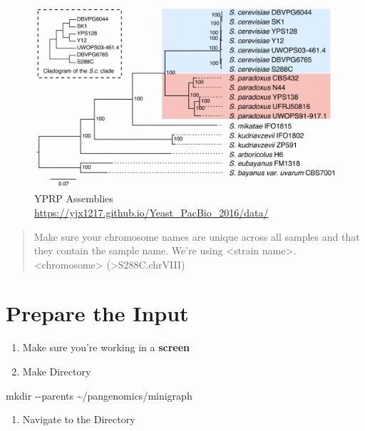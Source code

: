 \documentclass[
]{book}
\newenvironment{Shaded}{\begin{snugshade}}{\end{snugshade}}
\newcommand{\AttributeTok}[1]{\textcolor[rgb]{0.77,0.63,0.00}{#1}}
\newcommand{\FunctionTok}[1]{\textcolor[rgb]{0.00,0.00,0.00}{#1}}
\newcommand{\NormalTok}[1]{#1}
\providecommand{\tightlist}{%
  \setlength{\itemsep}{0pt}\setlength{\parskip}{0pt}}
\begin{document}
\begin{figure}
\centering
\includegraphics[width=1\textwidth,height=\textheight]{./Figures/Yeast.png}
\caption{YPRP Assemblies \url{https://yjx1217.github.io/Yeast_PacBio_2016/data/}}
\end{figure}

\begin{quote}
Make sure your chromosome names are unique across all samples and that they contain the sample name. We're using \textless strain name\textgreater.\textless chromosome\textgreater{} (\textgreater S288C.chrVIII)
\end{quote}

\hypertarget{prepare-the-input}{%
\section{Prepare the Input}\label{prepare-the-input}}

\begin{enumerate}
\def\labelenumi{\arabic{enumi}.}
\item
  Make sure you're working in a \textbf{screen}
\item
  Make Directory
\end{enumerate}

\begin{Shaded}
\begin{Highlighting}[]
\FunctionTok{mkdir} \AttributeTok{{-}{-}parents}\NormalTok{ \textasciitilde{}/pangenomics/minigraph}
\end{Highlighting}
\end{Shaded}

\begin{enumerate}
\def\labelenumi{\arabic{enumi}.}
\setcounter{enumi}{2}
\tightlist
\item
  Navigate to the Directory
\end{enumerate}
\end{document}
